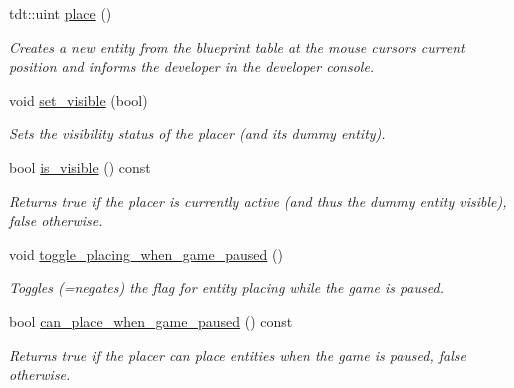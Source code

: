 \begin{DoxyCompactItemize}
tdt\+::uint \hyperlink{class_entity_placer_a29dd8e6e72ae7b0816be797e22392260}{place} ()
\begin{DoxyCompactList}\small\item\em Creates a new entity from the blueprint table at the mouse cursor\textquotesingle{}s current position and informs the developer in the developer console. \end{DoxyCompactList}\item 
void \hyperlink{class_entity_placer_a751003cd67901a18fae7d888394cf360}{set\+\_\+visible} (bool)
\begin{DoxyCompactList}\small\item\em Sets the visibility status of the placer (and it\textquotesingle{}s dummy entity). \end{DoxyCompactList}\item 
bool \hyperlink{class_entity_placer_aefbb8b16e6f7336b999231ebb021ba52}{is\+\_\+visible} () const 
\begin{DoxyCompactList}\small\item\em Returns true if the placer is currently active (and thus the dummy entity visible), false otherwise. \end{DoxyCompactList}\item 
void \hyperlink{class_entity_placer_ae207c65665d039caa6a16c8fcb15219a}{toggle\+\_\+placing\+\_\+when\+\_\+game\+\_\+paused} ()
\begin{DoxyCompactList}\small\item\em Toggles (=negates) the flag for entity placing while the game is paused. \end{DoxyCompactList}\item 
bool \hyperlink{class_entity_placer_afe268719c2c4e17bc30713452cead93d}{can\+\_\+place\+\_\+when\+\_\+game\+\_\+paused} () const 
\begin{DoxyCompactList}\small\item\em Returns true if the placer can place entities when the game is paused, false otherwise. \end{DoxyCompactList}\end{DoxyCompactItemize}

